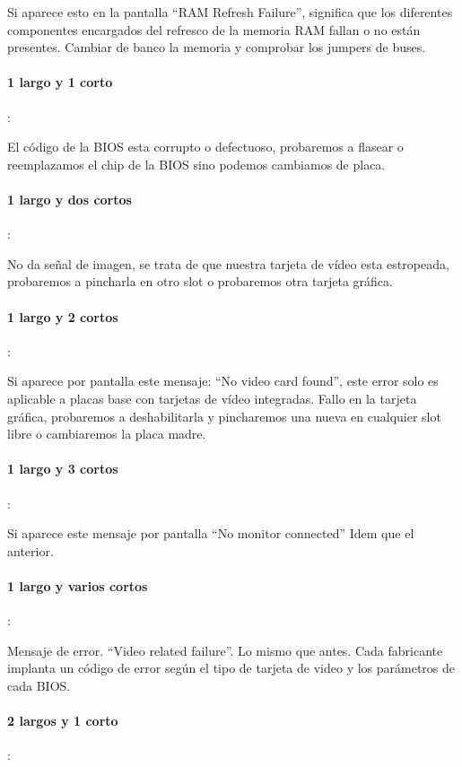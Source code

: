 \documentclass[12pt,oneside,a4paper]{article}
\begin{document}
			Si aparece esto en la pantalla “RAM Refresh Failure”, significa que los
			diferentes componentes encargados del refresco de la memoria RAM fallan
			o no están presentes. Cambiar de banco la memoria y comprobar los
			jumpers de buses. 

			\paragraph{1 largo y 1 corto}: 

			El código de la BIOS esta corrupto o defectuoso, probaremos a flasear o
			reemplazamos el chip de la BIOS sino podemos cambiamos de placa. 

			\paragraph{1 largo y dos cortos}:
			
			No da señal de imagen, se trata de que nuestra tarjeta de vídeo esta
			estropeada, probaremos a pincharla en otro slot o probaremos otra
			tarjeta gráfica. 

			\paragraph{1 largo y 2 cortos}:

			Si aparece por pantalla este mensaje: “No video card found”, este error
			solo es aplicable a placas base con tarjetas de vídeo integradas. Fallo
			en la tarjeta gráfica, probaremos a deshabilitarla y pincharemos una
			nueva en cualquier slot libre o cambiaremos la placa madre. 

			\paragraph{1 largo y 3 cortos}:

			Si aparece este mensaje por pantalla “No monitor connected” Idem que el
			anterior. 

			\paragraph{1 largo y varios cortos}: 

			Mensaje de error. “Video related failure”. Lo mismo que antes. Cada
			fabricante implanta un código de error según el tipo de tarjeta de
			video y los parámetros de cada BIOS.

			\paragraph{2 largos y 1 corto}:
			
\end{document}
